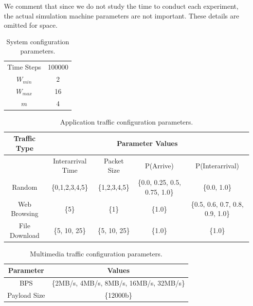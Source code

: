 \documentclass{llncs}
\begin{document}
We comment that since we do not study the time to conduct each experiment, the actual simulation machine parameters are not important. These details are omitted for space. 

\begin{table}
\begin{center}
\caption{System configuration parameters.}
\label{tab:configurations}
\begin{tabular}{|c|c|} \hline
	Time Steps & 100000 \\
	$W_{min}$ & 2 \\
	$W_{max}$ & 16 \\
	$m$ & 4 \\ \hline
\end{tabular}
\end{center}
\end{table}

\begin{table}
\begin{center}
\caption{Application traffic configuration parameters.}
\label{tab:traffics}
\begin{tabular}{|c|c|c|c|c|} \hline
	Traffic Type & \multicolumn{4}{c|}{Parameter Values} \\ \hline
	~ & Interarrival Time & Packet Size & P(Arrive) & P(Interarrival) \\ \hline \hline
	Random & \{0,1,2,3,4,5\} & \{1,2,3,4,5\} & \{0.0, 0.25, 0.5, 0.75, 1.0\} & \{0.0, 1.0\} \\ \hline
	Web Browsing & \{5\} & \{1\} & \{1.0\} & \{0.5, 0.6, 0.7, 0.8, 0.9, 1.0\} \\ \hline
	File Download & \{5, 10, 25\} & \{5, 10, 25\} & \{1.0\} & \{1.0\} \\ \hline
\end{tabular}
\end{center}
\end{table}

\begin{table}
\begin{center}
\caption{Multimedia traffic configuration parameters.}
\label{tab:multimedia}
\begin{tabular}{|c|c|} \hline
	Parameter & Values \\ \hline
	BPS & \{2MB/s, 4MB/s, 8MB/s, 16MB/s, 32MB/s\} \\
	Payload Size & \{12000b\} \\ \hline
\end{tabular}
\end{center}
\end{table}
\end{document}
